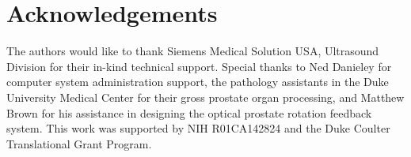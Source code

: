 \section*{Acknowledgements} 
The authors would like to thank Siemens Medical Solution USA, Ultrasound
Division for their in-kind technical support.  Special thanks to Ned Danieley
for computer system administration support, the pathology assistants in the
Duke University Medical Center for their gross prostate organ processing, and
Matthew Brown for his assistance in designing the optical prostate rotation
feedback system.  This work was supported by NIH R01CA142824 and the Duke
Coulter Translational Grant Program.
